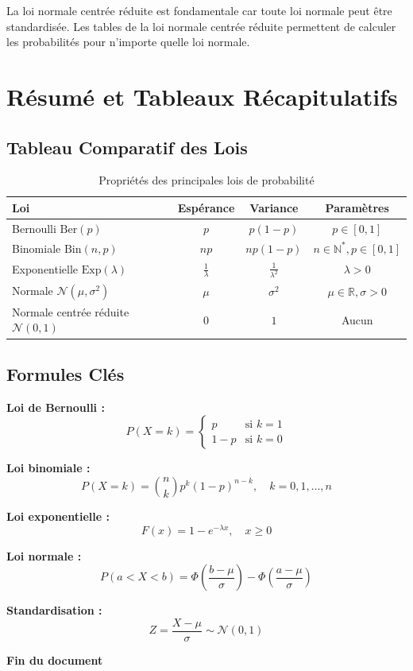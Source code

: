 \documentclass[11pt,a4paper]{article}
\newcommand{\Bin}{\text{Bin}}
\newcommand{\Exp}{\text{Exp}}
\newcommand{\Ber}{\text{Ber}}
\begin{document}
\begin{astucebox}
La loi normale centrée réduite est fondamentale car toute loi normale peut être standardisée. Les tables de la loi normale centrée réduite permettent de calculer les probabilités pour n'importe quelle loi normale.
\end{astucebox}

\newpage

\section{Résumé et Tableaux Récapitulatifs}

\subsection{Tableau Comparatif des Lois}

\begin{table}[h]
\centering
\small
\begin{tabular}{|l|c|c|c|}
\hline
\textbf{Loi} & \textbf{Espérance} & \textbf{Variance} & \textbf{Paramètres} \\
\hline
Bernoulli $\Ber(p)$ & $p$ & $p(1-p)$ & $p \in [0,1]$ \\
\hline
Binomiale $\Bin(n,p)$ & $np$ & $np(1-p)$ & $n \in \mathbb{N}^*, p \in [0,1]$ \\
\hline
Exponentielle $\Exp(\lambda)$ & $\frac{1}{\lambda}$ & $\frac{1}{\lambda^2}$ & $\lambda > 0$ \\
\hline
Normale $\mathcal{N}(\mu, \sigma^2)$ & $\mu$ & $\sigma^2$ & $\mu \in \mathbb{R}, \sigma > 0$ \\
\hline
Normale centrée réduite $\mathcal{N}(0,1)$ & $0$ & $1$ & Aucun \\
\hline
\end{tabular}
\caption{Propriétés des principales lois de probabilité}
\end{table}

\subsection{Formules Clés}

\begin{rappelbox}
\textbf{Loi de Bernoulli :}
$$P(X = k) = \begin{cases}
p & \text{si } k = 1 \\
1-p & \text{si } k = 0
\end{cases}$$

\textbf{Loi binomiale :}
$$P(X = k) = \binom{n}{k} p^k (1-p)^{n-k}, \quad k = 0, 1, \ldots, n$$

\textbf{Loi exponentielle :}
$$F(x) = 1 - e^{-\lambda x}, \quad x \geq 0$$

\textbf{Loi normale :}
$$P(a < X < b) = \Phi\left(\frac{b-\mu}{\sigma}\right) - \Phi\left(\frac{a-\mu}{\sigma}\right)$$

\textbf{Standardisation :}
$$Z = \frac{X - \mu}{\sigma} \sim \mathcal{N}(0, 1)$$
\end{rappelbox}

\vspace{2cm}

\begin{center}
\textbf{Fin du document}
\end{center}
\end{document}
